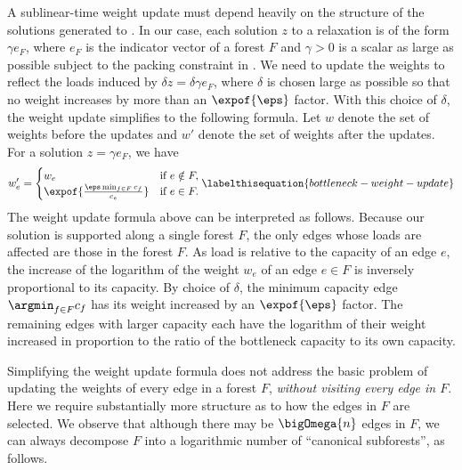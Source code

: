 \documentclass{toc}
\newcommand{\costof}[1]{c_{#1}}
\newcommand{\capacityof}{\costof}%
\newcommand{\weight}[1]{w_{#1}}
\newcommand{\weightv}{w}%
\begin{document}
A %
sublinear-time  %
weight update must depend heavily on the structure of
the solutions generated to . In our case, each
solution $z$ to a relaxation  is of the form
$\gamma e_F$, where $e_F$ is the indicator vector of a forest $F$ and
$\gamma > 0$ is a scalar as large as possible subject to the packing
constraint in . We need to update the weights
to reflect the loads induced by $\delta z = \delta \gamma e_F$, where
$\delta$ is chosen large as possible so that no weight increases by
more than an
%
$\expof{\eps}$ factor.   %
With this choice of
$\delta$, the weight update simplifies to the following formula. Let
$\weightv$ denote the set of weights before the updates and $\weightv'$
denote the set of weights after the updates. For a solution
$z = \gamma e_F$, we have
\begin{align*}
  \weight{e}' =                 %
  \begin{cases}
    \weight{e} &\text{if } e \notin F, \\
    \expof{ %
      \frac{\eps \min_{f \in F} \capacityof{f}}{\capacityof{e}} %
    }%
    &\text{if } e \in F.
  \end{cases}
      \labelthisequation{bottleneck-weight-update} %
\end{align*}
The weight update formula above can be interpreted as follows.
Because our solution is supported along a single forest $F$, the only
edges whose loads are affected are those in the forest $F$. As load is
relative to the capacity of an edge $e$, the increase of the logarithm
of the weight $\weight{e}$ of an edge $e \in F$ is inversely
proportional to its capacity. By choice of $\delta$, the minimum
capacity edge $\argmin_{f \in F} \capacityof{f}$ has its weight
increased by an
%
$\expof{\eps}$ factor.  %
The remaining
edges with larger capacity each have the logarithm of their weight
increased in proportion to the ratio of the bottleneck capacity to its
own capacity.

Simplifying the weight update formula does not address the basic
problem of updating the weights of every edge in a forest $F$,
\emph{without visiting every edge in $F$}. Here we require
substantially more structure as to how the edges in $F$ are
selected. We observe that although there may be $\bigOmega{n}$ edges
in $F$, we can always decompose $F$ into a logarithmic number of
``canonical subforests'', as follows.
\end{document}
